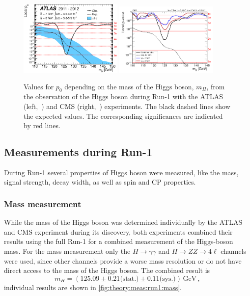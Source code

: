 \begin{figure}[htb]
    \centering
    \includegraphics[width=0.45\textwidth]{./figures/theory/atlas_higgs_p0.eps}
    \includegraphics[width=0.45\textwidth]{./figures/theory/cms_higgs_p0.png}
    \caption{Values for $p_0$ depending on the mass of the Higgs boson, $m_H$, from the observation of the
             Higgs boson during Run-1 with the ATLAS (left,~\cite{HiggsDiscoveryATLAS}) and CMS (right,~\cite{HiggsDiscoveryCMS}) experiments.
             The black dashed lines show the expected values.
             The corresponding significances are indicated by red lines.}\label{fig:theory:meas:disc:p0}
\end{figure}

\subsection{Measurements during Run-1}\label{sub:theory:meas:run1}

During Run-1 several properties of Higgs boson were measured, like the mass, signal strength, decay width, as well as
spin and CP properties.

\subsubsection{Mass measurement}\label{subsub:theory:meas:run1:mass}

While the mass of the Higgs boson was determined individually by the ATLAS and CMS experiment during its discovery,
both experiments combined their results using the full Run-1 for a combined measurement of the Higgs-boson mass.
For the mass measurement only the $H\to\gamma\gamma$ and $H\to ZZ \to 4\ell$ channels were used, since other channels
provide a worse mass resolution or do not have direct access to the mass of the Higgs boson.
The combined result is~\cite{MassCombinedMeas}
\begin{equation}
    m_H = (125.09 \pm 0.21 \text{(stat.)} \pm 0.11 \text{(sys.)})\,\text{GeV} \,,
\end{equation}
individual results are shown in \cref{fig:theory:meas:run1:mass}.

